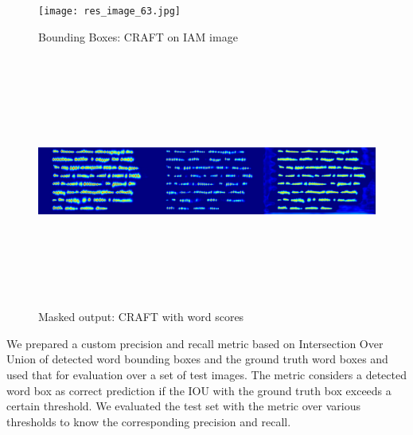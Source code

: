 \begin{figure}[H]
	\texttt{[image: res\_image\_63.jpg]}
	\caption{Bounding Boxes: CRAFT on IAM image}
\end{figure}

\begin{figure}[H]
	\includegraphics[width=500pt,height=235pt]{res_image_63_mask.jpg}
	\caption{Masked output: CRAFT with word scores}
\end{figure}

We prepared a custom precision and recall metric based on Intersection Over Union of detected word bounding boxes and the ground truth word boxes and used that for evaluation over a set of test images. The metric considers a detected word box as correct prediction if the IOU with the ground truth box exceeds a certain threshold. We evaluated the test set with the metric over various thresholds to know the corresponding precision and recall.


